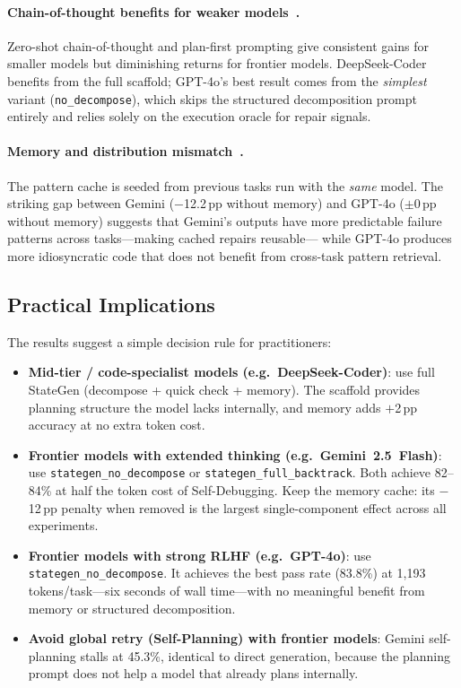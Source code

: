 \documentclass[11pt,twocolumn]{article}
\begin{document}
\paragraph{Chain-of-thought benefits for weaker models~\cite{kojima2022zeroshot,wang2023planandsolve}.}
Zero-shot chain-of-thought and plan-first prompting give consistent gains for
smaller models but diminishing returns for frontier models.
DeepSeek-Coder benefits from the full scaffold; GPT-4o's best result comes from
the \emph{simplest} variant (\texttt{no\_decompose}), which skips the
structured decomposition prompt entirely and relies solely on the execution
oracle for repair signals.

\paragraph{Memory and distribution mismatch~\cite{huang2023selfcorrect}.}
The pattern cache is seeded from previous tasks run with the \emph{same} model.
The striking gap between Gemini ($-$12.2\,pp without memory) and GPT-4o
($\pm$0\,pp without memory) suggests that Gemini's outputs have more
predictable failure patterns across tasks---making cached repairs reusable---
while GPT-4o produces more idiosyncratic code that does not benefit from
cross-task pattern retrieval.

\subsection{Practical Implications}

The results suggest a simple decision rule for practitioners:
\begin{itemize}[leftmargin=1.5em, itemsep=1pt]
  \item \textbf{Mid-tier / code-specialist models (e.g.\ DeepSeek-Coder)}:
        use full StateGen (decompose + quick check + memory). The scaffold
        provides planning structure the model lacks internally, and memory
        adds $+$2\,pp accuracy at no extra token cost.
  \item \textbf{Frontier models with extended thinking (e.g.\ Gemini~2.5~Flash)}:
        use \texttt{stategen\_no\_decompose} or \texttt{stategen\_full\_backtrack}.
        Both achieve 82--84\% at half the token cost of Self-Debugging.
        Keep the memory cache: its $-$12\,pp penalty when removed is the
        largest single-component effect across all experiments.
  \item \textbf{Frontier models with strong RLHF (e.g.\ GPT-4o)}: use
        \texttt{stategen\_no\_decompose}. It achieves the best pass rate
        (83.8\%) at 1,193 tokens/task---six seconds of wall time---with no
        meaningful benefit from memory or structured decomposition.
  \item \textbf{Avoid global retry (Self-Planning) with frontier models}:
        Gemini self-planning stalls at 45.3\%, identical to direct generation,
        because the planning prompt does not help a model that already plans
        internally.
\end{itemize}
\end{document}
